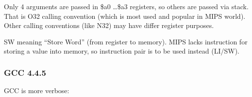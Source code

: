 Only 4 arguments are passed in \$a0 \dots \$a3 registers, so others are passed via stack.
That is O32 calling convention (which is most used and popular in MIPS world).
Other calling conventions (like N32) may have differ register purposes.

SW meaning ``Store Word'' (from register to memory).
MIPS lacks instruction for storing a value into memory, so instruction pair is to be used instead (LI/SW).





\subsubsection{\NonOptimizing GCC 4.4.5}

\NonOptimizing GCC is more verbose:





\fi
